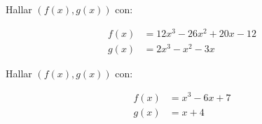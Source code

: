         \begin{ejercicio}
            Hallar $(f(x), g(x))$ con:

            \begin{align*}
                f(x) &= 12 x^3 - 26 x^2 + 20 x - 12 \\
                g(x) &= 2 x^3 - x^2 - 3 x
            \end{align*}
        \end{ejercicio}

        \begin{ejercicio}
            Hallar $(f(x), g(x))$ con:

            \begin{align*}
                f(x) &= x^3 - 6 x + 7 \\
                g(x) &= x + 4
            \end{align*}
        \end{ejercicio}
